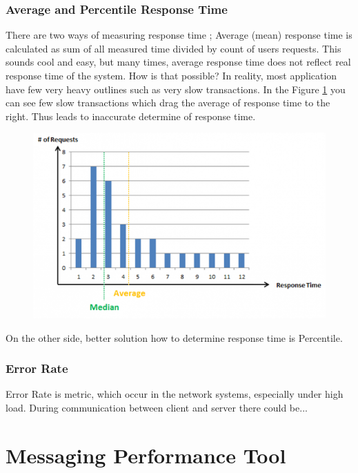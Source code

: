 \subsection*{Average and Percentile Response Time}
There are two ways of measuring response time \cite{Kopp:RPT}; Average (mean) response time is calculated as sum of all measured time divided by count of users requests. This sounds cool and easy, but many times, average response time does not reflect real response time of the system. How is that possible? In reality, most application have few very heavy outlines such as very slow transactions. In the Figure \ref{fig:average_percentil_1} you can see few slow transactions which drag the average of response time to the right. Thus leads to inaccurate determine of response time.


\begin{figure}[H]
  \centering
  \includegraphics[width=15cm]{obrazky-figures/average_vs_percentile.png}
  \caption{}
  \label{fig:average_percentil_1}
\end{figure}

On the other side, better solution how to determine response time is Percentile.

\subsection{Error Rate}
Error Rate is metric, which occur in the network systems, especially under high load. During communication between client and server there could be... 

\chapter{Messaging Performance Tool}
\label{Messaging Performance Tool}

